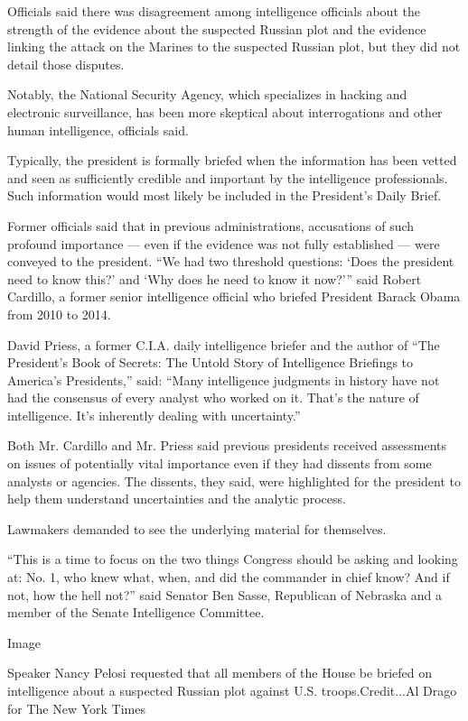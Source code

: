 Officials said there was disagreement among intelligence officials about
the strength of the evidence about the suspected Russian plot and the
evidence linking the attack on the Marines to the suspected Russian
plot, but they did not detail those disputes.

Notably, the National Security Agency, which specializes in hacking and
electronic surveillance, has been more skeptical about interrogations
and other human intelligence, officials said.

Typically, the president is formally briefed when the information has
been vetted and seen as sufficiently credible and important by the
intelligence professionals. Such information would most likely be
included in the President's Daily Brief.

Former officials said that in previous administrations, accusations of
such profound importance --- even if the evidence was not fully
established --- were conveyed to the president. ``We had two threshold
questions: `Does the president need to know this?' and `Why does he need
to know it now?''' said Robert Cardillo, a former senior intelligence
official who briefed President Barack Obama from 2010 to 2014.

David Priess, a former C.I.A. daily intelligence briefer and the author
of ``The President's Book of Secrets: The Untold Story of Intelligence
Briefings to America's Presidents,'' said: ``Many intelligence judgments
in history have not had the consensus of every analyst who worked on it.
That's the nature of intelligence. It's inherently dealing with
uncertainty.''

Both Mr. Cardillo and Mr. Priess said previous presidents received
assessments on issues of potentially vital importance even if they had
dissents from some analysts or agencies. The dissents, they said, were
highlighted for the president to help them understand uncertainties and
the analytic process.

Lawmakers demanded to see the underlying material for themselves.

``This is a time to focus on the two things Congress should be asking
and looking at: No. 1, who knew what, when, and did the commander in
chief know? And if not, how the hell not?'' said Senator Ben Sasse,
Republican of Nebraska and a member of the Senate Intelligence
Committee.

Image

Speaker Nancy Pelosi requested that all members of the House be briefed
on intelligence about a suspected Russian plot against U.S.
troops.Credit...Al Drago for The New York Times

